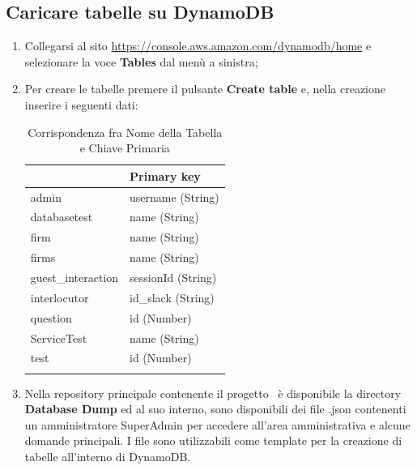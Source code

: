 \documentclass[../ManualeSviluppatore_v1.0.0.tex]{subfiles}
\begin{document}
	\subsection{Caricare tabelle su DynamoDB}
		\begin{enumerate}
		\item Collegarsi al sito \url{https://console.aws.amazon.com/dynamodb/home} e selezionare la voce \textbf{Tables} dal menù a sinistra;
		\item Per creare le tabelle premere il pulsante \textbf{Create table} e, nella creazione inserire i seguenti dati:
			\begin{longtable}[c] { >{\centering\arraybackslash}p{5cm} >{\centering\arraybackslash}p{5cm} }
				\toprule
				{\textbf{Table name}} & {\textbf{Primary key}} \\
				\midrule
				admin & username (String) \\
		 		\addlinespace[0.3em]
				\midrule
				databasetest & name (String) \\
		 		\addlinespace[0.3em]
		 		\midrule
				firm & name (String) \\
		 		\addlinespace[0.3em]
		 		\midrule
				firms & name (String) \\
		 		\addlinespace[0.3em]
		 		\midrule
				guest\_interaction & sessionId (String) \\
		 		\addlinespace[0.3em]
		 		\midrule
				interlocutor & id\_slack (String) \\
		 		\addlinespace[0.3em]
		 		\midrule
				question & id (Number) \\
		 		\addlinespace[0.3em]
		 		\midrule
				ServiceTest & name (String) \\
		 		\addlinespace[0.3em]
		 		\midrule
				test & id (Number) \\
		 		\addlinespace[0.3em]
		 		\bottomrule
		 		\caption{Corrispondenza fra Nome della Tabella e Chiave Primaria}
		 	\end{longtable}
		\item Nella repository principale contenente il progetto \atavi\ è disponibile la directory \textbf{Database Dump} ed al suo interno, sono disponibili dei file .json contenenti un amministratore SuperAdmin per accedere all'area amministrativa e alcune domande principali. I file sono utilizzabili come template per la creazione di tabelle all'interno di DynamoDB.
	\end{enumerate}
	
\end{document}
